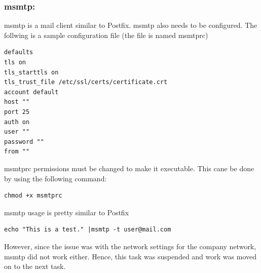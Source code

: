 \subsubsection{msmtp:} msmtp is a mail client similar to Postfix. msmtp also needs to be configured. The follwing is a sample configuration file (the file is named msmtprc) \cite{msmtp}

\begin{lstlisting}[style=ShellStyle]
defaults
tls on
tls_starttls on
tls_trust_file /etc/ssl/certs/certificate.crt
account default
host ""
port 25
auth on
user ""
password ""
from ""
\end{lstlisting}
msmtprc permissions must be changed to make it executable. This cane be done by using the following command:
\begin{lstlisting}[style=ShellStyle]
chmod +x msmtprc
\end{lstlisting}
msmtp usage is pretty similar to Postfix 
\begin{lstlisting}[style=ShellStyle]
echo "This is a test." |msmtp -t user@mail.com
\end{lstlisting}
However, since the issue was with the network settings for the company network, msmtp did not work either. Hence, this task was suspended and work was moved on to the next task.\\

